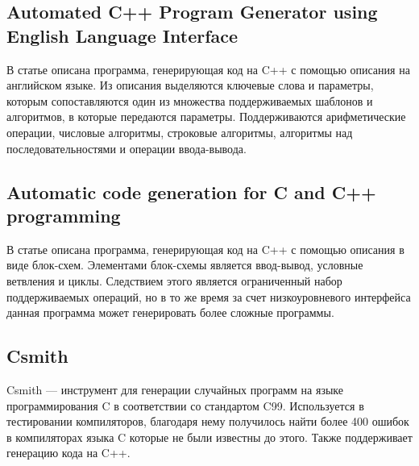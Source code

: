 


\subsection{Automated C++ Program Generator using English Language Interface}

В статье \cite{pg-eli} описана программа, генерирующая код на C++ с помощью описания на английском языке.
Из описания выделяются ключевые слова и параметры, которым сопоставляются один из множества поддерживаемых шаблонов и алгоритмов, в которые передаются параметры.
Поддерживаются арифметические операции, числовые алгоритмы, строковые алгоритмы, алгоритмы над последовательностями и операции ввода-вывода.


\subsection{Automatic code generation for C and C++ programming}

В статье \cite{acg-2021} описана программа, генерирующая код на C++ с помощью описания в виде блок-схем.
Элементами блок-схемы является ввод-вывод, условные ветвления и циклы.
Следствием этого является ограниченный набор поддерживаемых операций,
но в то же время за счет низкоуровневого интерфейса данная программа может генерировать более сложные программы.

\subsection{Csmith}

Csmith --- инструмент для генерации случайных программ на языке программирования C в соответствии со стандартом C99.
Используется в тестировании компиляторов, благодаря нему получилось найти более 400 ошибок в компиляторах языка C которые не были известны до этого.
Также поддерживает генерацию кода на C++. \cite{csmith}
% 


